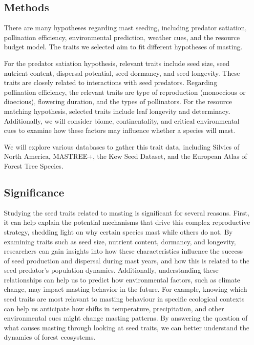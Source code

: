 \documentclass[12pt,letter]{article}
\begin{document}
\subsection{Methods}
There are many hypotheses regarding mast seeding, including predator satiation, pollination efficiency, environmental prediction, weather cues, and the resource budget model. The traits we selected aim to fit different hypotheses of masting.

For the predator satiation hypothesis, relevant traits include seed size, seed nutrient content, dispersal potential, seed dormancy, and seed longevity. These traits are closely related to interactions with seed predators. Regarding pollination efficiency, the relevant traits are type of reproduction (monoecious or dioecious), flowering duration, and the types of pollinators. For the resource matching hypothesis, selected traits include leaf longevity and determinacy. Additionally, we will consider biome, continentality, and critical environmental cues to examine how these factors may influence whether a species will mast.

We will explore various databases to gather this trait data, including Silvics of North America, MASTREE+, the Kew Seed Dataset, and the European Atlas of Forest Tree Species.
\subsection{Significance} 
Studying the seed traits related to masting is significant for several reasons. First, it can help explain the potential mechanisms that drive this complex reproductive strategy, shedding light on why certain species mast while others do not. By examining traits such as seed size, nutrient content, dormancy, and longevity, researchers can gain insights into how these characteristics influence the success of seed production and dispersal during mast years, and how this is related to the seed predator's population dynamics.
Additionally, understanding these relationships can help us to predict how environmental factors, such as climate change, may impact masting behavior in the future. For example, knowing which seed traits are most relavant to masting behaviour in specific ecological contexts can help us anticipate how shifts in temperature, precipitation, and other environmental cues might change masting patterns. By answering the question of what causes masting through looking at seed traits, we can better understand the dynamics of forest ecosystems.
\end{document}
